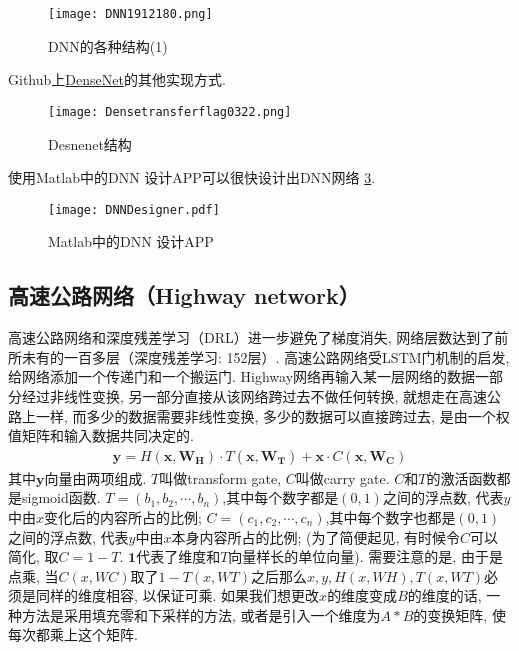 \begin{figure}[H]
\centering
\texttt{[image: DNN1912180.png]}
\caption{DNN的各种结构(1)}
\label{DNN191218121500010}
\end{figure}
Github上\href{https://github.com/zggl/DenseNet}{DenseNet}的其他实现方式.
\begin{figure}[H]
\centering
\texttt{[image: Densetransferflag0322.png]}
\caption{Desnenet结构}
\label{Densetransferflag03220304}
\end{figure}

使用Matlab中的DNN 设计APP可以很快设计出DNN网络 \ref{DNNDesigner20200304}.
\begin{figure}[H]
\centering
\texttt{[image: DNNDesigner.pdf]}
\caption{Matlab中的DNN 设计APP}
\label{DNNDesigner20200304}
\end{figure}

\subsection{高速公路网络（Highway network）}
高速公路网络和深度残差学习（DRL）进一步避免了梯度消失, 网络层数达到了前所未有的一百多层（深度残差学习: 152层）\cite{HeCVPR2016-9590, NIPS2015-5850}.
高速公路网络受LSTM门机制的启发, 给网络添加一个传递门和一个搬运门. Highway网络再输入某一层网络的数据一部分经过非线性变换, 另一部分直接从该网络跨过去不做任何转换, 就想走在高速公路上一样, 而多少的数据需要非线性变换, 多少的数据可以直接跨过去, 是由一个权值矩阵和输入数据共同决定的.
\begin{align}
\mathbf{y}=H\left(\mathbf{x}, \mathbf{W}_{\mathbf{H}}\right) \cdot T\left(\mathbf{x}, \mathbf{W}_{\mathbf{T}}\right)+\mathbf{x} \cdot C\left(\mathbf{x}, \mathbf{W}_{\mathbf{C}}\right)
\end{align}
其中$\bm y$向量由两项组成. $T$叫做transform gate, $C$叫做carry gate. $C$和$T$的激活函数都是sigmoid函数.
$T=(b_1, b_2, \cdots, b_n)$,其中每个数字都是$(0, 1)$之间的浮点数, 代表$y$中由$x$变化后的内容所占的比例;
$C=(c_1, c_2, \cdots, c_n)$,其中每个数字也都是$(0, 1)$之间的浮点数, 代表$y$中由$x$本身内容所占的比例;
(为了简便起见, 有时候令$C$可以简化, 取$C=1-T$. $\bm 1$代表了维度和$T$向量样长的单位向量).
需要注意的是, 由于是点乘, 当$C(x,WC)$取了$1-T(x,WT)$之后那么$x,y,H(x,WH),T(x,WT)$必须是同样的维度相容, 以保证可乘.
如果我们想更改$x$的维度变成$B$的维度的话, 一种方法是采用填充零和下采样的方法, 或者是引入一个维度为$A*B$的变换矩阵, 使每次都乘上这个矩阵.

